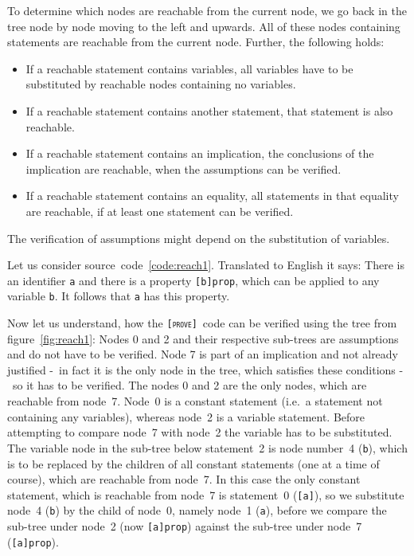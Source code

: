 \documentclass[british]{article}
\newcommand\prv{bc}
\newcommand\m[1]{\texttt{#1}}
\newcommand\name{\texttt{\textsc{[prove]}}}
\begin{document}
To determine which nodes are reachable from the current node, we go back in the
tree node by node moving to the left and upwards. All of these nodes containing
statements are reachable from the current node. Further, the following holds:

\begin{itemize}
	\item
		If a reachable statement contains variables, all variables have to be
		substituted by reachable nodes containing no variables.
	\item
		If a reachable statement contains another statement, that statement is
		also reachable.
	\item
		If a reachable statement contains an implication, the conclusions of the
		implication are reachable, when the assumptions can be verified. 
	\item
		If a reachable statement contains an equality, all statements in that
		equality are reachable, if at least one statement can be verified.
\end{itemize}

The verification of assumptions might depend on the substitution of variables.
\newline

Let us consider source~code~\ref{code:reach1}. Translated to English it says:
There is an identifier \m{a} and there is a property \m{[b]prop}, which can be
applied to any variable \m{b}. It follows that \m{a} has this property.
\newline

Now let us understand, how the \name\ code can be verified using the tree from
figure~\ref{fig:reach1}: Nodes 0 and 2 and their respective sub-trees are
assumptions and do not have to be verified. Node 7 is part of an implication
and not already justified -\ in fact it is the only node in the tree, which
satisfies these conditions -\ so it has to be verified. The nodes 0 and 2 are
the only nodes, which are reachable from node~7. Node~0 is a constant statement
(i.e.\ a statement not containing any variables), whereas node~2 is a variable
statement. Before attempting to compare node~7 with node~2 the variable has to
be substituted. The variable node in the sub-tree below statement~2 is node
number~4 (\m{b}), which is to be replaced by the children of all constant
statements (one at a time of course), which are reachable from node~7. In this
case the only constant statement, which is reachable from node~7 is statement~0
(\m{[a]}), so we substitute node~4 (\m{b}) by the child of node~0, namely node~1
(\m{a}), before we compare the sub-tree under node~2 (now \m{[a]prop}) against
the sub-tree under node~7 (\m{[a]prop}).
\newline
\end{document}
